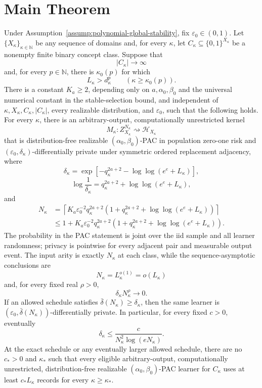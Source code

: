 \section{Main Theorem}\label{sec:main}

\begin{theorem}
\label{thm:main}
Under Assumption~\ref{assump:polynomial-global-stability}, fix
\(\varepsilon_0\in(0,1)\).  Let
\(\{X_\kappa\}_{\kappa\in\mathbb N}\) be any sequence of domains and,
for every \(\kappa\), let
\(C_\kappa\subseteq\{0,1\}^{X_\kappa}\) be a nonempty finite binary
concept class.  Suppose that
\[
|C_\kappa|\to\infty
\]
and, for every \(p\in\mathbb N\), there is \(\kappa_0(p)\) for which
\[
L_\kappa>d_\kappa^p
\qquad(\kappa\geq\kappa_0(p)).
\]
There is a constant \(K_a\geq2\), depending only on
\(a,\alpha_0,\beta_0\) and the universal numerical constant in the
stable-selection bound, and independent of
\(\kappa,X_\kappa,C_\kappa,|C_\kappa|\), every realizable
distribution, and \(\varepsilon_0\), such that the following holds.
For every \(\kappa\), there is an arbitrary-output,
computationally unrestricted kernel
\[
M_\kappa:
Z_{X_\kappa}^{N_\kappa}
\rightsquigarrow\mathcal H_{X_\kappa}
\]
that is distribution-free realizable
\((\alpha_0,\beta_0)\)-PAC in population zero-one risk and
\((\varepsilon_0,\delta_\kappa)\)-differentially private under
symmetric ordered replacement adjacency, where
\[
\delta_\kappa
=
\exp\!\left[
-q_\kappa^{2a+2}
-\log\log(e^e+L_\kappa)
\right],
\]
\[
\log\frac1{\delta_\kappa}
=q_\kappa^{2a+2}+\log\log(e^e+L_\kappa),
\]
and
\[
\begin{aligned}
N_\kappa
&=
\left\lceil
K_a\varepsilon_0^{-2}q_\kappa^{2a+2}
\left(
1+q_\kappa^{2a+2}
+\log\log(e^e+L_\kappa)
\right)
\right\rceil\\
&\leq
1+K_a\varepsilon_0^{-2}q_\kappa^{2a+2}
\left(
1+q_\kappa^{2a+2}
+\log\log(e^e+L_\kappa)
\right).
\end{aligned}
\]
The probability in the PAC statement is joint over the iid sample
and all learner randomness; privacy is pointwise for every adjacent
pair and measurable output event.  The input arity is exactly
\(N_\kappa\) at each class, while the sequence-asymptotic conclusions
are
\[
N_\kappa=L_\kappa^{o(1)}=o(L_\kappa)
\]
and, for every fixed real \(\rho>0\),
\[
\delta_\kappa N_\kappa^\rho\longrightarrow0.
\]
If an allowed schedule satisfies
\(\bar\delta(N_\kappa)\geq\delta_\kappa\), then the same learner is
\((\varepsilon_0,\bar\delta(N_\kappa))\)-differentially private.
In particular, for every fixed \(c>0\), eventually
\[
\delta_\kappa
\leq\frac{c}{N_\kappa^2\log(eN_\kappa)}.
\]
At the exact schedule or any eventually larger allowed schedule,
there are no \(c_*>0\) and \(\kappa_*\) such that every eligible
arbitrary-output, computationally unrestricted,
distribution-free realizable \((\alpha_0,\beta_0)\)-PAC learner for
\(C_\kappa\) uses at least \(c_*L_\kappa\) records for every
\(\kappa\geq\kappa_*\).


\end{theorem}

